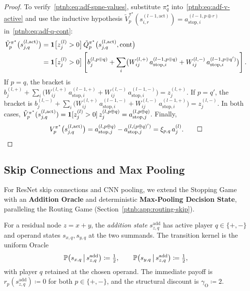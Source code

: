 \begin{proof}
To verify~\eqref{ptnb:eq:adf-spne-values}, substitute $\pi_q^\star$ into~\eqref{ptnb:eq:adf-v-active} and use
the inductive hypothesis $\tilde{V}_p^{\pi^\star}(s_{i,r}^{(l-1, \mathrm{act})}) =
    a_{\mathrm{stop},i}^{(l-1, p \oplus r)}$ in~\eqref{ptnb:eq:adf-q-cont}:
\begin{align}
    \tilde{V}_p^{\pi^\star}\bigl(s_{j,q}^{(l, \mathrm{act})}\bigr)
    &= \1\bigl[z_j^{(l)} > 0\bigr]\, \tilde{Q}_p^{\pi^\star}\bigl(s_{j,q}^{(l, \mathrm{act})},
    \mathrm{cont}\bigr) \\
    &= \1\bigl[z_j^{(l)} > 0\bigr] \left[ b_j^{(l, p \oplus q)} + \sum_i \bigl( W_{ij}^{(l,+)}\,
    a_{\mathrm{stop},i}^{(l-1, p \oplus q)} + W_{ij}^{(l,-)}\, a_{\mathrm{stop},i}^{(l-1, p \oplus q')}
    \bigr) \right].
\end{align}
If $p=q$, the bracket is $b_j^{(l,+)} + \sum_i \bigl( W_{ij}^{(l,+)}\,
    a_{\mathrm{stop},i}^{(l-1,+)} + W_{ij}^{(l,-)}\, a_{\mathrm{stop},i}^{(l-1,-)} \bigr) =
    z_j^{(l,+)}$.
If $p=q'$, the bracket is $b_j^{(l,-)} + \sum_i \bigl( W_{ij}^{(l,+)}\,
    a_{\mathrm{stop},i}^{(l-1,-)} + W_{ij}^{(l,-)}\, a_{\mathrm{stop},i}^{(l-1,+)} \bigr) =
    z_j^{(l,-)}$.
In both cases, $\tilde{V}_p^{\pi^\star}(s_{j,q}^{(l, \mathrm{act})}) = \1[z_j^{(l)} > 0]\, z_j^{(l,
    p \oplus q)} = a_{\mathrm{stop},j}^{(l, p \oplus q)}$. Finally,
\begin{align}
    V_p^{\pi^\star}\bigl(s_{j,q}^{(l, \mathrm{act})}\bigr)
    = a_{\mathrm{stop},j}^{(l, p \oplus q)} - a_{\mathrm{stop},j}^{(l, (p \oplus q)')}
    = \xi_{p,q}\, a_j^{(l)}.
    \qed
\end{align}
\end{proof}

\subsection{Skip Connections and Max Pooling}\label{ptnb:app:skip-connections}

For ResNet skip connections and CNN pooling, we extend the Stopping Game with an
\textbf{Addition Oracle} and deterministic \textbf{Max-Pooling Decision State}, paralleling the
Routing Game (Section~\ref{ptnb:app:routing-skip}).

\begin{definition}\label{ptnb:def:addition-subgame}
For a residual node $z = x + y$, the \emph{addition state} $s_{z,q}^{\mathrm{add}}$ has active
player $q \in \{+,-\}$ and operand states $s_{x,q}, s_{y,q}$ at the two summands. The transition
kernel is the uniform Oracle
\begin{align}
    \P\bigl(s_{x,q} \,\big|\, s_{z,q}^{\mathrm{add}}\bigr) \coloneqq \tfrac{1}{2},
    \qquad
    \P\bigl(s_{y,q} \,\big|\, s_{z,q}^{\mathrm{add}}\bigr) \coloneqq \tfrac{1}{2},
\end{align}
with player $q$ retained at the chosen operand. The immediate payoff is
$r_p(s_{z,q}^{\mathrm{add}}) \coloneqq 0$ for both $p \in \{+,-\}$, and the structural discount is
$\gamma_{\mathrm{O}} \coloneqq 2$.
\end{definition}

